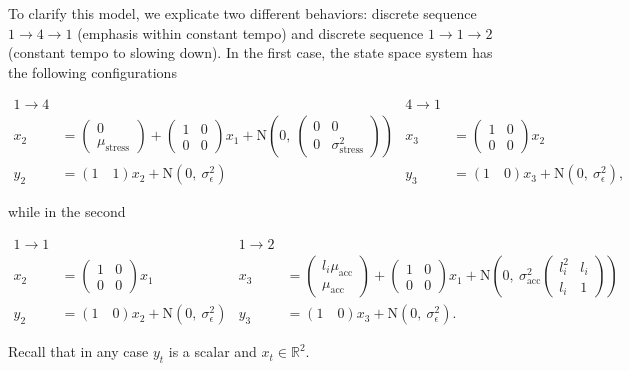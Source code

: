 \documentclass[12pt]{article}
\begin{document}
To clarify this model, we explicate two different behaviors: discrete
sequence $1\rightarrow 4\rightarrow 1$ (emphasis within constant tempo) and discrete sequence
$1\rightarrow 1\rightarrow 2$ (constant tempo to slowing down). In the
first case, the state space system has the following configurations
\begin{footnotesize}
\begin{align*}
  1\rightarrow 4 && 4\rightarrow 1\\
  x_{2} &= \begin{pmatrix} 0\\ \mu_{\textrm{stress}} \end{pmatrix}
  + \begin{pmatrix}1&0\\0&0\end{pmatrix} x_{1} +
                           \mbox{N}\left(0,\ \begin{pmatrix}0&0\\0&\sigma_{\textrm{stress}}^2\end{pmatrix}\right)
        &   x_{3}
                    &= 
  \begin{pmatrix}1&0\\0&0\end{pmatrix} x_{2} \\
  y_2 &= (1\quad  1)  x_2 + \mbox{N}(0,\
                                 \sigma_\epsilon^2) &
y_3 &= (1\quad  0) x_3 + \mbox{N}(0,\
                                 \sigma_\epsilon^2),
\end{align*}
\end{footnotesize}

\noindent while in the second
\begin{footnotesize}
\begin{align*}
  1\rightarrow 1 && 1\rightarrow 2\\
  x_{2} &= 
  \begin{pmatrix}1&0\\0&0\end{pmatrix} x_{1} 
        &   x_{3}
                    &= \begin{pmatrix} l_i\mu_{\textrm{acc}}\\ \mu_{\textrm{acc}}\end{pmatrix} +
  \begin{pmatrix}1&0\\0&0\end{pmatrix} x_{1} +
                         \mbox{N}\left(0,\ \sigma_{\textrm{acc}}^2\begin{pmatrix} l_i^2 & l_i\\ l_i & 1 \end{pmatrix}\right)\\
  y_2 &= (1\quad  0)  x_2 + \mbox{N}(0,\
                                 \sigma_\epsilon^2) &
y_3 &= (1\quad  0) x_3 + \mbox{N}(0,\
                                 \sigma_\epsilon^2).
\end{align*}
\end{footnotesize}
Recall that in any case $y_t$ is a scalar and $x_t \in \mathbb{R}^2$.
\end{document}
